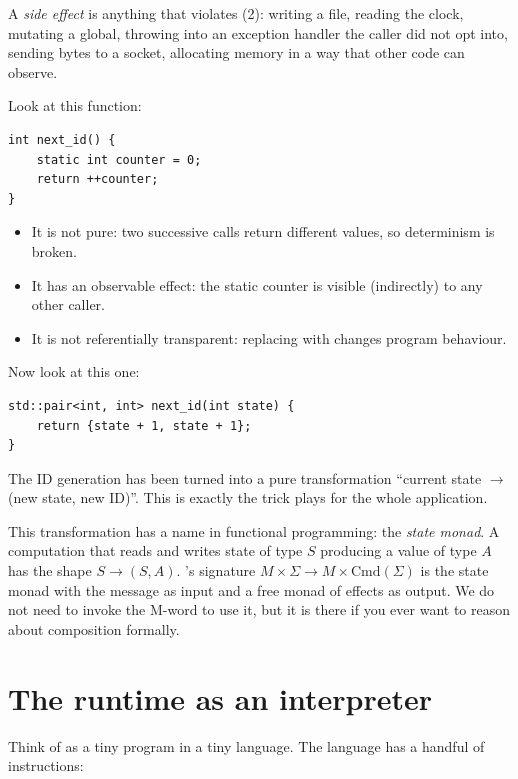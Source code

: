 A \emph{side effect} is anything that violates (2): writing a
file, reading the clock, mutating a global, throwing into an
exception handler the caller did not opt into, sending bytes to a
socket, allocating memory in a way that other code can observe.

Look at this function:

\begin{lstlisting}
int next_id() {
    static int counter = 0;
    return ++counter;
}
\end{lstlisting}

\begin{itemize}[leftmargin=*]
  \item It is not pure: two successive calls return different
    values, so determinism is broken.
  \item It has an observable effect: the static counter is
    visible (indirectly) to any other caller.
  \item It is not referentially transparent: replacing
     with  changes program behaviour.
\end{itemize}

Now look at this one:

\begin{lstlisting}
std::pair<int, int> next_id(int state) {
    return {state + 1, state + 1};
}
\end{lstlisting}

The ID generation has been turned into a pure transformation
``current state $\to$ (new state, new ID)''. This is exactly the
trick \maya{} plays for the whole application.

\begin{funfact}
This transformation has a name in functional programming: the
\emph{state monad}. A computation that reads and writes state of
type $S$ producing a value of type $A$ has the shape
$S \to (S, A)$. 's signature
$M \times \Sigma \to M \times \mathrm{Cmd}(\Sigma)$ is the state
monad with the message as input and a free monad of effects as
output. We do not need to invoke the M-word to use it, but it is
there if you ever want to reason about composition formally.
\end{funfact}

\section{The runtime as an interpreter}

Think of  as a tiny program in a tiny language. The
language has a handful of instructions:

